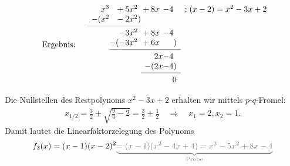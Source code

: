 \begin{align}
    \qq{Ergebnis: }\begin{array}{r@{} r@{} r@{} r r}
        x^3 &{}+5x^2\hphantom{)}&{}+8x\hphantom{)}&-4\hphantom{)} &:(x-2) = x^2 -3x +2 \\
      -(x^2 &{}-2x^2) &\\
      \cmidrule{1-2}
            & -3x^2\hphantom{)} &{}+8x\hphantom{)}&-4\hphantom{)}\\
            &-(-3x^2\hphantom{)} &{}+6x\hphantom{)}&\hphantom{-4}) \\
      \cmidrule{2-4}
            & &{}2x&-4\hphantom{)}\\
            & &-(2x&-4)\\
      \cmidrule{3-4} 
            & & & 0
    \end{array}
\end{align}

Die Nullstellen des Restpolynoms $x^2 -3x +2$ erhalten wir mittels $p$-$q$-Fromel: 
\begin{align}
    x_{1/2} = \frac{3}{2} \pm \sqrt{\frac{9}{4}-2} = \frac{3}{2} \pm \frac{1}{2} \quad \Rightarrow \quad x_1 = 2, x_2 =1.
\end{align}
Damit lautet die Linearfaktorzelegung des Polynoms  
\begin{align}
    f_3(x) = (x-1) (x-2)^2 \textcolor{gray}{\underbrace{= (x-1)(x^2-4x+4) = x^3-5x^2 + 8x-4}_{\text{Probe}}}
\end{align}